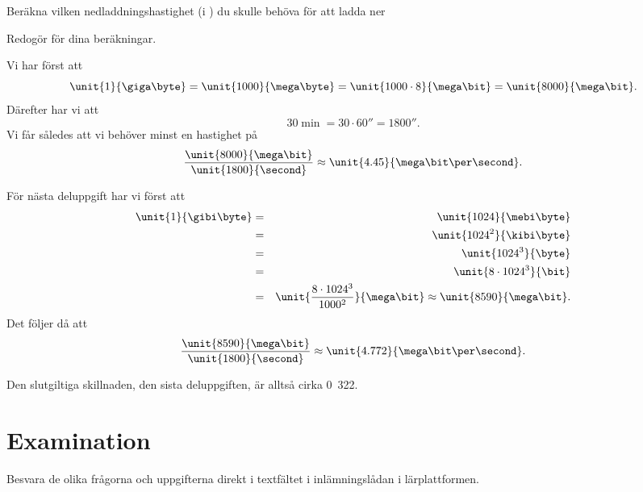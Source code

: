 \documentclass[a4paper]{miunasgn}
\begin{document}
\begin{questions}
\question
Beräkna vilken nedladdningshastighet (i \mega\bit\per\second) du skulle behöva 
för att ladda
ner

Redogör för dina beräkningar.
\begin{solution}
	Vi har först att \[
		\unit{1}{\giga\byte} = \unit{1000}{\mega\byte} =
		\unit{1000\cdot 8}{\mega\bit} = \unit{8000}{\mega\bit}.
	\]
	Därefter har vi att \[
		\unit{30}{\min} = \unit{30\cdot 60}{\second} =
		\unit{1800}{\second}.
	\]
	Vi får således att vi behöver minst en hastighet på \[
		\frac{\unit{8000}{\mega\bit}}{\unit{1800}{\second}} \approx
		\unit{4.45}{\mega\bit\per\second}.
	\]

	För nästa deluppgift har vi först att
	\begin{eqnarray*}
		\unit{1}{\gibi\byte} &=& \unit{1024}{\mebi\byte} \\
			&=& \unit{1024^2}{\kibi\byte} \\
			&=& \unit{1024^3}{\byte} \\
			&=& \unit{8\cdot 1024^3}{\bit} \\
			&=& \unit{\frac{8\cdot 1024^3}{1000^2}}{\mega\bit} \approx 
			\unit{8590}{\mega\bit}.
	\end{eqnarray*}
	Det följer då att \[
		\frac{\unit{8590}{\mega\bit}}{\unit{1800}{\second}} \approx
		\unit{4.772}{\mega\bit\per\second}.
	\]

	Den slutgiltiga skillnaden, den sista deluppgiften, är alltså cirka 
	\unit{0.322}{\mega\bit\per\second}.
\end{solution}

\end{questions}


\section{Examination}
\label{sec:Examination}
\noindent
Besvara de olika frågorna och uppgifterna direkt i textfältet i inlämningslådan 
i lärplattformen.



\end{document}
